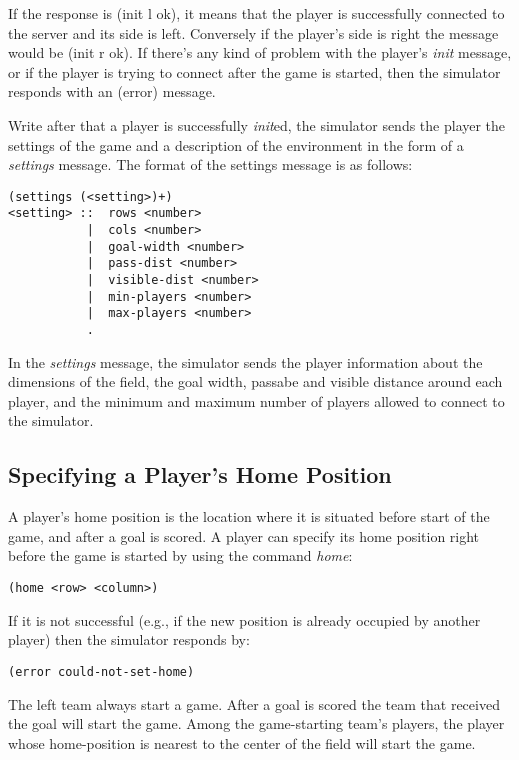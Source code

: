 \documentclass[12pt,titlepage,a4paper]{article}
\begin{document}
If the response is \textrm{(init l ok)}, it means that the player is successfully connected to the server and its side is left. Conversely if the player's side is right the message would be \textrm{(init r ok)}. If there's any kind of problem with the player's \emph{init} message, or if the player is trying to connect after the game is started, then the simulator responds with an \textrm{(error)} message.

Write after that a player is successfully \emph{init}ed, the simulator sends the player the settings of the game and a description of the environment in the form of a \emph{settings} message. The format of the settings message is as follows:
\begin{verbatim}
(settings (<setting>)+)
<setting> ::  rows <number>
           |  cols <number>
           |  goal-width <number>
           |  pass-dist <number>
           |  visible-dist <number>
           |  min-players <number>
           |  max-players <number>
           .
\end{verbatim}

In the \emph{settings} message, the simulator sends the player information about the dimensions of the field, the goal width, passabe and visible distance around each player, and the minimum and maximum number of players allowed to connect to the simulator.

\subsection{Specifying a Player's Home Position}

A player's home position is the location where it is situated before start of the game, and after a goal is scored. A player can specify its home position right before the game is started by using the command \emph{home}:
\begin{verbatim}
(home <row> <column>)
\end{verbatim}

If it is not successful (e.g., if the new position is already occupied by another player) then the simulator responds by:
\begin{verbatim}
(error could-not-set-home)
\end{verbatim}

The left team always start a game. After a goal is scored the team that received the goal will start the game. Among the game-starting team's players, the player whose home-position is nearest to the center of the field will start the game.
\end{document}
